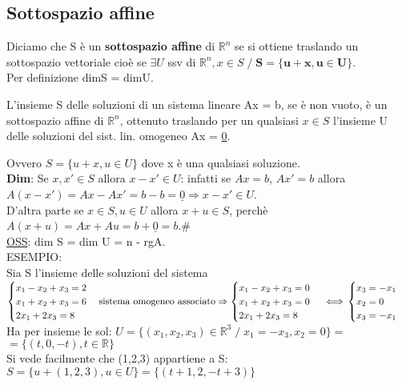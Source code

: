 \documentclass[12pt]{article}
\begin{document}
\subsection{Sottospazio affine}
Diciamo che S è un \textbf{sottospazio affine} di $\mathbb{R}^n$ se si ottiene traslando un sottospazio vettoriale cioè se $\exists U$ ssv di $\mathbb{R}^n, x\in S \;/\; \boldsymbol{S=\{u+x, u\in U\}}$.\\
Per definizione dimS = dimU.\\
\begin{theorem}
    L'insieme S delle soluzioni di un sistema lineare Ax = b, se è non vuoto, è un sottospazio affine di $\mathbb{R}^n$, ottenuto traslando per un qualsiasi $x \in S$ l'insieme U delle soluzioni del sist. lin. omogeneo Ax = \underline{0}. 
\end{theorem}
Ovvero $S=\{u+x, u\in U\}$ dove x è una qualsiasi soluzione.\\
\textbf{Dim}: Se $x,x' \in S$ allora $x-x' \in U$: infatti se $Ax = b$, $Ax' = b$ allora $A(x-x')=Ax-Ax'=b-b=\underline{0} \Rightarrow x-x' \in U$.\\
D'altra parte se $x\in S, u\in U$ allora $x+u \in S$, perchè $A(x+u) = Ax+Au=b+\underline{0} = b$.\#\\
\underline{OSS}: dim S = dim U = n - rgA.\\

\noindent ESEMPIO:\\
Sia S l'insieme delle soluzioni del sistema\\
$\begin{cases}
    x_1-x_2+x_3 = 2\\
    x_1+x_2+x_3 = 6\\
    2x_1+2x_3 = 8
    
\end{cases}
\text{sistema omogeneo associato} \Rightarrow
\begin{cases}
        x_1-x_2+x_3 = 0\\
        x_1+x_2+x_3 = 0\\
        2x_1+2x_3 = 8
    \end{cases}
    \iff\\
    \begin{cases}
        x_3 = -x_1\\
        x_2 = 0\\
        x_3 = -x_1
    \end{cases}\\\\
$
Ha per insieme le sol: $U = \{(x_1,x_2,x_3) \in \mathbb{R}^3 \;/\; x_1=-x_3, x_2=0\}=$\\
$=\{(t,0,-t), t\in \mathbb{R}\}$\\
Si vede facilmente che (1,2,3) appartiene a S:\\ 
$S=\{u+(1,2,3), u\in U\}=\{(t+1, 2, -t+3)\}$
\end{document}
